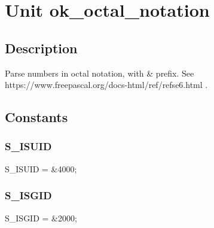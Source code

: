 \documentclass{report}
\begin{document}
\newlength{\tmplength}
\chapter{Unit ok{\_}octal{\_}notation}
\section{Description}
Parse numbers in octal notation, with {\&} prefix. See https://www.freepascal.org/docs-html/ref/refse6.html .
\section{Constants}
\subsection*{S{\_}ISUID}
\begin{list}{}{
\setlength{\itemindent}{0cm}
\setlength{\listparindent}{0cm}
\setlength{\leftmargin}{\evensidemargin}
\addtolength{\leftmargin}{\tmplength}
\settowidth{\labelsep}{X}
\addtolength{\leftmargin}{\labelsep}
\setlength{\labelwidth}{\tmplength}
}
\begin{flushleft}
\item[\textbf{Declaration}\hfill]
\begin{ttfamily}
S{\_}ISUID = {\&}4000;\end{ttfamily}


\end{flushleft}
\end{list}
\subsection*{S{\_}ISGID}
\begin{list}{}{
\setlength{\itemindent}{0cm}
\setlength{\listparindent}{0cm}
\setlength{\leftmargin}{\evensidemargin}
\addtolength{\leftmargin}{\tmplength}
\settowidth{\labelsep}{X}
\addtolength{\leftmargin}{\labelsep}
\setlength{\labelwidth}{\tmplength}
}
\begin{flushleft}
\item[\textbf{Declaration}\hfill]
\begin{ttfamily}
S{\_}ISGID = {\&}2000;\end{ttfamily}


\end{flushleft}
\end{list}
\end{document}
